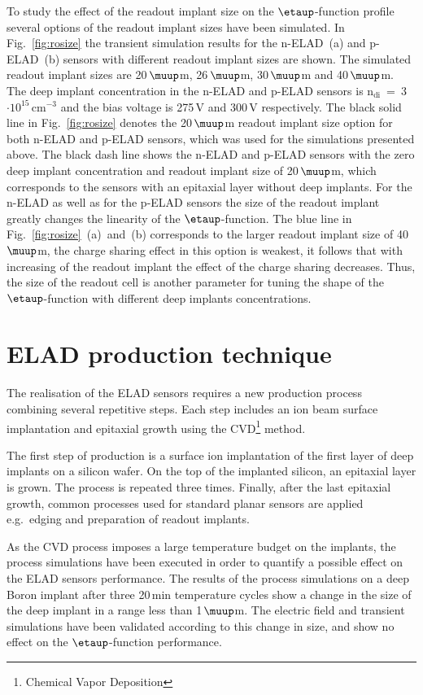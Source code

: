 \documentclass[a4paper,11pt]{article}
\begin{document}
To study the effect of the readout implant size on the $\etaup$-function profile several options of the readout implant sizes have been simulated. 
In Fig.~\ref{fig:rosize} the transient simulation results for the n-ELAD~(a) and p-ELAD~(b) sensors with different readout implant sizes are shown.
The simulated readout implant sizes are 20\,$\muup$m, 26\,$\muup$m, 30\,$\muup$m and 40\,$\muup$m.
The deep implant concentration in the n-ELAD and p-ELAD sensors is $\mathrm{n_{di}}$~=~3$\mathrm{\cdot10^{15}\,cm^{-3}}$ and the bias voltage is 275\,V and 300\,V respectively. 
The black solid line in Fig.~\ref{fig:rosize} denotes the 20\,$\muup$m readout implant size option for both n-ELAD and p-ELAD sensors, which was used for the simulations presented above.
The black dash line shows the n-ELAD and p-ELAD sensors with the zero deep implant concentration and readout implant size of 20\,$\muup$m, which corresponds to the sensors with an epitaxial layer without deep implants.
For the n-ELAD as well as for the p-ELAD sensors the size of the readout implant greatly changes the linearity of the $\etaup$-function.
The blue line in Fig.~\ref{fig:rosize}~(a)~and~(b) corresponds to the larger readout implant size of 40\,$\muup$m, the charge sharing effect in this option is weakest, it follows that with increasing of the readout implant the effect of the charge sharing decreases.  
Thus, the size of the readout cell is another parameter for tuning the shape of the $\etaup$-function with different deep implants concentrations.

\section{ELAD production technique}
\label{sec:pr}
The realisation of the ELAD sensors requires a new production process combining several repetitive steps.
Each step includes an ion beam surface implantation and epitaxial growth using the CVD\footnote{Chemical Vapor Deposition} method. 

The first step of production is a surface ion implantation of the first layer of deep implants on a silicon wafer.
On the top of the implanted silicon, an epitaxial layer is grown.
The process is repeated three times. 
Finally, after the last epitaxial growth, common processes used for standard planar sensors are applied e.g.\ edging and preparation of readout implants.

As the CVD process imposes a large temperature budget on the implants, the process simulations have been executed in order to quantify a possible effect on the ELAD sensors performance. 
The results of the process simulations on a deep Boron implant after three 20\,min temperature cycles show a change in the size of the deep implant in a range less than 1\,$\muup$m.
The electric field and transient simulations have been validated according to this change in size, and show no effect on the $\etaup$-function performance.
\end{document}
